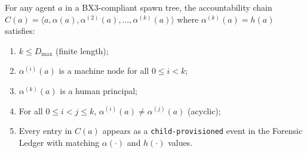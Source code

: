 \begin{property}
\label{prop:chain-integrity}
For any agent $a$ in a BX3-compliant spawn tree, the accountability chain
$C(a) = \langle a, \alpha(a), \alpha^{(2)}(a), \ldots, \alpha^{(k)}(a) \rangle$
where $\alpha^{(k)}(a) = h(a)$ satisfies:
\begin{enumerate}
  \item $k \leq D_{\max}$ (finite length);
  \item $\alpha^{(i)}(a)$ is a machine node for all $0 \leq i < k$;
  \item $\alpha^{(k)}(a)$ is a human principal;
  \item For all $0 \leq i < j \leq k$, $\alpha^{(i)}(a) \neq \alpha^{(j)}(a)$ (acyclic);
  \item Every entry in $C(a)$ appears as a \texttt{child-provisioned} event in the Forensic Ledger with matching $\alpha(\cdot)$ and $h(\cdot)$ values.
\end{enumerate}
\end{property}

